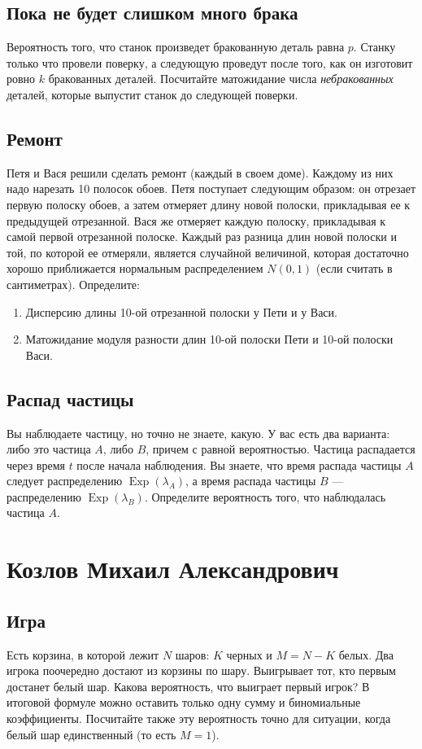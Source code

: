 \documentclass[12pt]{article}
\DeclareMathOperator{\Exp}{Exp}
\begin{document}
\subsection{Пока не будет слишком много брака}
Вероятность того, что станок произведет бракованную деталь равна $p$. Станку только что провели поверку, а следующую проведут после того, как он изготовит ровно $k$ бракованных деталей. Посчитайте матожидание числа \emph{небракованных} деталей, которые выпустит станок до следующей поверки.

\subsection{Ремонт}
Петя и Вася решили сделать ремонт (каждый в своем доме). Каждому из них надо нарезать 10 полосок обоев. Петя поступает следующим образом: он отрезает первую полоску обоев, а затем отмеряет длину новой полоски, прикладывая ее к предыдущей отрезанной. Вася же отмеряет каждую полоску, прикладывая к самой первой отрезанной полоске. Каждый раз разница длин новой полоски и той, по которой ее отмеряли, является случайной величиной, которая достаточно хорошо приближается нормальным распределением $N(0, 1)$ (если считать в сантиметрах). Определите:
\begin{enumerate}
    \item Дисперсию длины 10-ой отрезанной полоски у Пети и у Васи.
    \item Матожидание модуля разности длин 10-ой полоски Пети и 10-ой полоски Васи. 
\end{enumerate}

\subsection{Распад частицы}
Вы наблюдаете частицу, но точно не знаете, какую. У вас есть два варианта: либо это частица $A$, либо $B$, причем с равной вероятностью. Частица распадается через время $t$ после начала наблюдения. Вы знаете, что время распада частицы $A$ следует распределению $\Exp(\lambda_A)$, а время распада частицы $B$ --- распределению $\Exp(\lambda_B)$. Определите вероятность того, что наблюдалась частица $A$.

\newpage
\section{Козлов Михаил Александрович}

\subsection{Игра}
Есть корзина, в которой лежит $N$ шаров: $K$ черных и $M = N - K$ белых. Два игрока поочередно достают из корзины по шару. Выигрывает тот, кто первым достанет белый шар. Какова вероятность, что выиграет первый игрок? В итоговой формуле можно оставить только одну сумму и биномиальные коэффициенты. Посчитайте также эту вероятность точно для ситуации, когда белый шар единственный (то есть $M = 1$).
\end{document}
